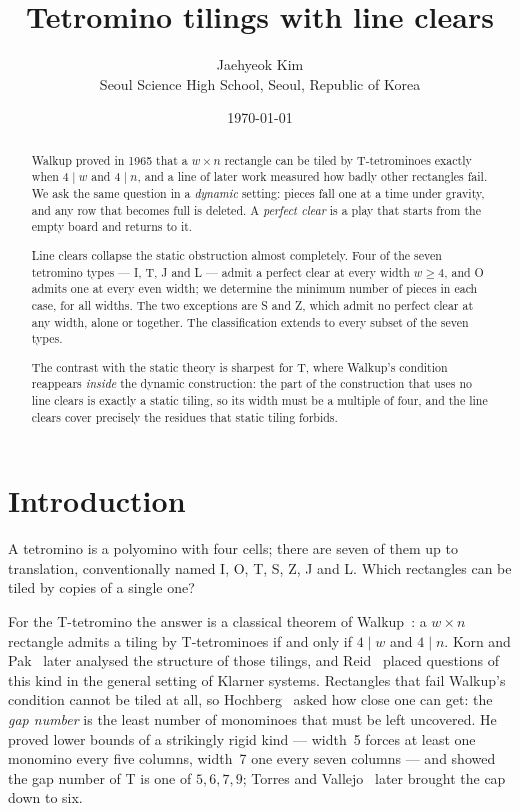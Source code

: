 \documentclass[11pt,a4paper]{article}
\title{Tetromino tilings with line clears}
\author{Jaehyeok Kim\\[2pt]
\small Seoul Science High School, Seoul, Republic of Korea}
\date{\today}
\theoremstyle{plain}
\theoremstyle{definition}
\theoremstyle{remark}
\begin{document}
\maketitle

\begin{abstract}
Walkup proved in 1965 that a $w \times n$ rectangle can be tiled by T-tetrominoes
exactly when $4 \mid w$ and $4 \mid n$, and a line of later work measured how badly
other rectangles fail. We ask the same question in a \emph{dynamic} setting: pieces
fall one at a time under gravity, and any row that becomes full is deleted. A
\emph{perfect clear} is a play that starts from the empty board and returns to it.

Line clears collapse the static obstruction almost completely. Four of the seven
tetromino types --- I, T, J and L --- admit a perfect clear at every width $w \geq 4$,
and O admits one at every even width; we determine the minimum number of pieces in
each case, for all widths. The two exceptions are S and Z, which admit no perfect
clear at any width, alone or together. The classification extends to every subset of
the seven types.

The contrast with the static theory is sharpest for T, where Walkup's condition
reappears \emph{inside} the dynamic construction: the part of the construction that
uses no line clears is exactly a static tiling, so its width must be a multiple of
four, and the line clears cover precisely the residues that static tiling forbids.
\end{abstract}

\section{Introduction}

A tetromino is a polyomino with four cells; there are seven of them up to
translation, conventionally named I, O, T, S, Z, J and L. Which rectangles can be
tiled by copies of a single one?

For the T-tetromino the answer is a classical theorem of
Walkup~\cite{walkup1965}: a $w \times n$ rectangle admits a tiling by
T-tetrominoes if and only if $4 \mid w$ and $4 \mid n$. Korn and
Pak~\cite{kornpak2004} later analysed the structure of those tilings, and
Reid~\cite{reid2005} placed questions of this kind in the general setting of
Klarner systems.
Rectangles that fail Walkup's condition cannot be tiled at all, so
Hochberg~\cite{hochberg2015} asked how close one can get: the \emph{gap number} is
the least number of monominoes that must be left uncovered. He proved lower bounds
of a strikingly rigid kind --- width~5 forces at least one monomino every five
columns, width~7 one every seven columns --- and showed the gap number of T is one
of $5, 6, 7, 9$; Torres and Vallejo~\cite{torresvallejo2024} later brought the cap
down to six.
\end{document}
